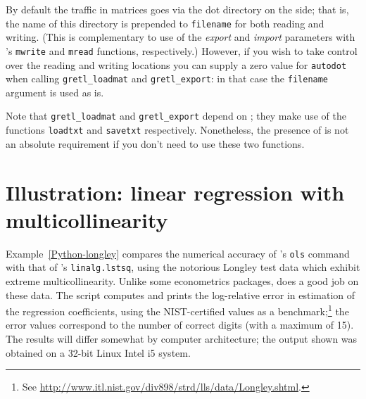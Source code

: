 By default the traffic in matrices goes via the dot directory on the
 side; that is, the name of this directory is prepended to
\texttt{filename} for both reading and writing. (This is complementary
to use of the \textsl{export} and \textsl{import} parameters with
's \texttt{mwrite} and \texttt{mread} functions,
respectively.) However, if you wish to take control over the reading
and writing locations you can supply a zero value for
\texttt{autodot} when calling \verb|gretl_loadmat| and
\verb|gretl_export|: in that case the \texttt{filename} argument is
used as is.

Note that \verb|gretl_loadmat| and \verb|gretl_export| depend on
; they make use of the functions \texttt{loadtxt} and
\texttt{savetxt} respectively. Nonetheless, the presence of
 is not an absolute requirement if you don't need
to use these two functions.

\section{Illustration: linear regression with multicollinearity}
\label{sec:Python-longley}

Example~\ref{Python-longley} compares the numerical accuracy of
's \texttt{ols} command with that of 's
\texttt{linalg.lstsq}, using the notorious Longley test data which
exhibit extreme multicollinearity.  Unlike some econometrics packages,
 does a good job on these data. The script computes and
prints the log-relative error in estimation of the regression
coefficients, using the NIST-certified values as a
benchmark;\footnote{See
  \url{http://www.itl.nist.gov/div898/strd/lls/data/Longley.shtml}.}
the error values correspond to the number of correct digits (with a
maximum of 15). The results will differ somewhat by computer
architecture; the output shown was obtained on a 32-bit Linux Intel i5
system.

